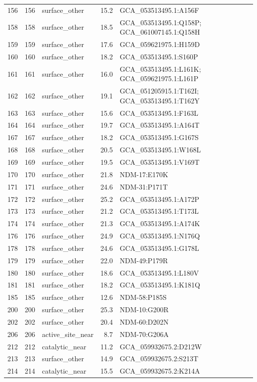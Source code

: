 \begin{longtable}{rrlrl}
156&156&surface\_other&15.2&GCA\_053513495.1:A156F\\
158&158&surface\_other&18.5&GCA\_053513495.1:Q158P; GCA\_061007145.1:Q158H\\
159&159&surface\_other&17.6&GCA\_059621975.1:H159D\\
160&160&surface\_other&18.2&GCA\_053513495.1:S160P\\
161&161&surface\_other&16.0&GCA\_053513495.1:L161K; GCA\_059621975.1:L161P\\
162&162&surface\_other&19.1&GCA\_051205915.1:T162I; GCA\_053513495.1:T162Y\\
163&163&surface\_other&15.6&GCA\_053513495.1:F163L\\
164&164&surface\_other&19.7&GCA\_053513495.1:A164T\\
167&167&surface\_other&18.2&GCA\_053513495.1:G167S\\
168&168&surface\_other&20.5&GCA\_053513495.1:W168L\\
169&169&surface\_other&19.5&GCA\_053513495.1:V169T\\
170&170&surface\_other&21.8&NDM-17:E170K\\
171&171&surface\_other&24.6&NDM-31:P171T\\
172&172&surface\_other&25.2&GCA\_053513495.1:A172P\\
173&173&surface\_other&21.2&GCA\_053513495.1:T173L\\
174&174&surface\_other&21.3&GCA\_053513495.1:A174K\\
176&176&surface\_other&24.9&GCA\_053513495.1:N176Q\\
178&178&surface\_other&24.6&GCA\_053513495.1:G178L\\
179&179&surface\_other&22.0&NDM-49:P179R\\
180&180&surface\_other&18.6&GCA\_053513495.1:L180V\\
181&181&surface\_other&18.2&GCA\_053513495.1:K181Q\\
185&185&surface\_other&12.6&NDM-58:P185S\\
200&200&surface\_other&25.3&NDM-10:G200R\\
202&202&surface\_other&20.4&NDM-60:D202N\\
206&206&active\_site\_near&8.7&NDM-70:G206A\\
212&212&catalytic\_near&11.2&GCA\_059932675.2:D212W\\
213&213&surface\_other&14.9&GCA\_059932675.2:S213T\\
214&214&catalytic\_near&15.5&GCA\_059932675.2:K214A\\

\end{longtable}
